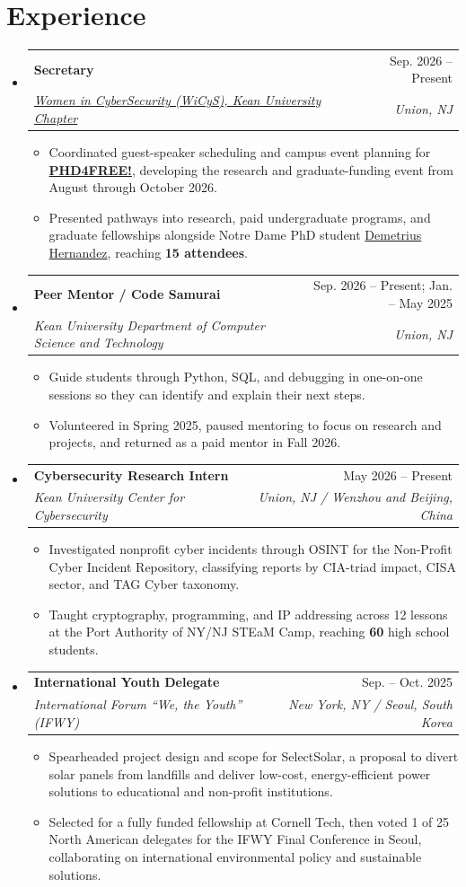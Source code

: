 \documentclass[letterpaper,11pt]{article}
\makeatletter
\newcommand{\resumeItem}[1]{
  \item\small{#1}
}
\newcommand{\resumeSubheading}[4]{
  \vspace{-1pt}\item
    \begin{tabular*}{0.97\textwidth}[t]{l@{\extracolsep{\fill}}r}
      {\normalsize\textbf{#1}} & {\normalsize #2} \\
      \textit{\small#3} & \textit{\small #4} \\
    \end{tabular*}\vspace{-7pt}
}
\newcommand{\resumeSubHeadingListStart}{\begin{itemize}[leftmargin=0.15in, label={}, topsep=0pt, partopsep=0pt, itemsep=0pt]\small}
\newcommand{\resumeSubHeadingListEnd}{\end{itemize}}
\newcommand{\resumeItemListStart}{\begin{itemize}[topsep=1pt, itemsep=-2pt, parsep=0pt]}
\newcommand{\resumeItemListEnd}{\end{itemize}\vspace{-6pt}}
\makeatother
\begin{document}
\section{Experience}
  \resumeSubHeadingListStart
    \resumeSubheading
      {Secretary}{Sep. 2026 -- Present}
      {\href{https://kean.campuslabs.com/engage/organization/wicyskean}{Women in CyberSecurity (WiCyS), Kean University Chapter}}{Union, NJ}
      \resumeItemListStart
        \resumeItem{Coordinated guest-speaker scheduling and campus event planning for \href{https://kean.campuslabs.com/engage/event/12870047}{\textbf{PHD4FREE!}}, developing the research and graduate-funding event from August through October 2026.}
        \resumeItem{Presented pathways into research, paid undergraduate programs, and graduate fellowships alongside Notre Dame PhD student \href{https://www.linkedin.com/in/demetrius-hernandez/}{Demetrius Hernandez}, reaching \textbf{15 attendees}.}
      \resumeItemListEnd

    \resumeSubheading
      {Peer Mentor / Code Samurai}{Sep. 2026 -- Present; Jan. -- May 2025}
      {Kean University Department of Computer Science and Technology}{Union, NJ}
      \resumeItemListStart
        \resumeItem{Guide students through Python, SQL, and debugging in one-on-one sessions so they can identify and explain their next steps.}
        \resumeItem{Volunteered in Spring 2025, paused mentoring to focus on research and projects, and returned as a paid mentor in Fall 2026.}
      \resumeItemListEnd

    \resumeSubheading
      {Cybersecurity Research Intern}{May 2026 -- Present}
      {Kean University Center for Cybersecurity}{Union, NJ / Wenzhou and Beijing, China}
      \resumeItemListStart
        \resumeItem{Investigated nonprofit cyber incidents through OSINT for the Non-Profit Cyber Incident Repository, classifying reports by CIA-triad impact, CISA sector, and TAG Cyber taxonomy.}
        \resumeItem{Taught cryptography, programming, and IP addressing across 12 lessons at the Port Authority of NY/NJ STEaM Camp, reaching \textbf{60} high school students.}
      \resumeItemListEnd

    \resumeSubheading
      {International Youth Delegate}{Sep. -- Oct. 2025}
      {International Forum ``We, the Youth'' (IFWY)}{New York, NY / Seoul, South Korea}
      \resumeItemListStart
        \resumeItem{Spearheaded project design and scope for SelectSolar, a proposal to divert solar panels from landfills and deliver low-cost, energy-efficient power solutions to educational and non-profit institutions.}
        \resumeItem{Selected for a fully funded fellowship at Cornell Tech, then voted 1 of 25 North American delegates for the IFWY Final Conference in Seoul, collaborating on international environmental policy and sustainable solutions.}
      \resumeItemListEnd
  \resumeSubHeadingListEnd
\end{document}
